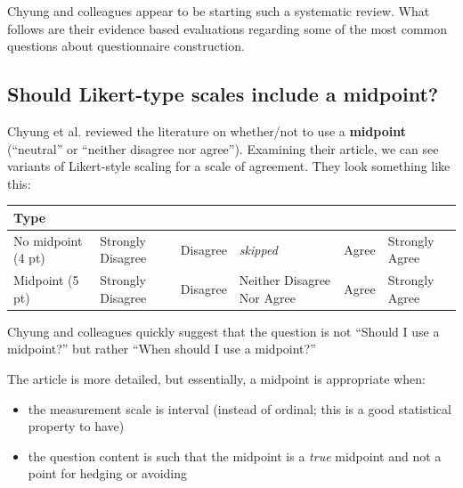 \documentclass[
  english,
]{book}
\providecommand{\tightlist}{%
  \setlength{\itemsep}{0pt}\setlength{\parskip}{0pt}}
\begin{document}
Chyung and colleagues appear to be starting such a systematic review. What follows are their evidence based evaluations regarding some of the most common questions about questionnaire construction.

\hypertarget{should-likert-type-scales-include-a-midpoint}{%
\subsection{Should Likert-type scales include a midpoint?}\label{should-likert-type-scales-include-a-midpoint}}

Chyung et al. \citeyearpar{chyung_evidence-based_2017} reviewed the literature on whether/not to use a \textbf{midpoint} (``neutral'' or ``neither disagree nor agree''). Examining their article, we can see variants of Likert-style scaling for a scale of agreement. They look something like this:

\begin{longtable}[]{@{}
  >{\raggedright\arraybackslash}p{}
  >{\raggedright\arraybackslash}p{}
  >{\raggedright\arraybackslash}p{}
  >{\raggedright\arraybackslash}p{}
  >{\raggedright\arraybackslash}p{}
  >{\raggedright\arraybackslash}p{}@{}}
\toprule
Type & & & & & \\
\midrule
\endhead
No midpoint (4 pt) & Strongly Disagree & Disagree & \emph{skipped} & Agree & Strongly Agree \\
Midpoint (5 pt) & Strongly Disagree & Disagree & Neither Disagree Nor Agree & Agree & Strongly Agree \\
\bottomrule
\end{longtable}

Chyung and colleagues quickly suggest that the question is not ``Should I use a midpoint?'' but rather ``When should I use a midpoint?''

The article is more detailed, but essentially, a midpoint is appropriate when:

\begin{itemize}
\tightlist
\item
  the measurement scale is interval (instead of ordinal; this is a good statistical property to have)
\item
  the question content is such that the midpoint is a \emph{true} midpoint and not a point for hedging or avoiding
\end{itemize}
\end{document}
